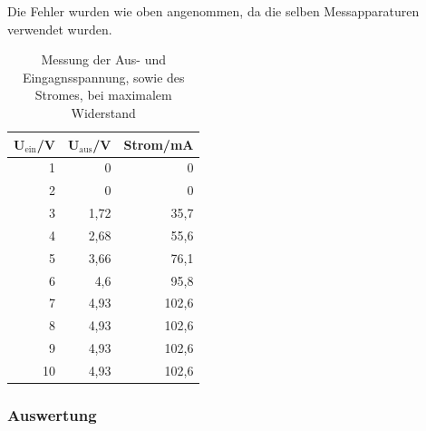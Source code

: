 \documentclass[12pt,a4paper]{article}
\begin{document}
Die Fehler wurden wie oben angenommen, da die selben Messapparaturen verwendet wurden.

\begin{table}[H]
\caption{Messung der Aus- und Eingagnsspannung, sowie des Stromes, bei maximalem Widerstand}
\begin{center}
\begin{tabular}{|r|r|r|}
\hline
\multicolumn{1}{|l|}{U$_\text{ein}$/V} & \multicolumn{1}{l|}{U$_\text{aus}$/V} & \multicolumn{1}{l|}{Strom/mA} \\ \hline
1 & 0 & 0 \\ \hline
2 & 0 & 0 \\ \hline
3 & 1,72 & 35,7 \\ \hline
4 & 2,68 & 55,6 \\ \hline
5 & 3,66 & 76,1 \\ \hline
6 & 4,6 & 95,8 \\ \hline
7 & 4,93 & 102,6 \\ \hline
8 & 4,93 & 102,6 \\ \hline
9 & 4,93 & 102,6 \\ \hline
10 & 4,93 & 102,6 \\ \hline
\end{tabular}
\end{center}
\label{tab:3_4_max}
\end{table}


\subsubsection{Auswertung}
\end{document}
